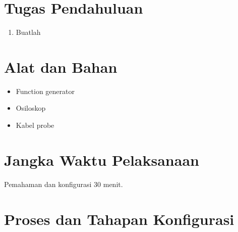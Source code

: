 \section{Tugas Pendahuluan}
\begin{enumerate}
\item Buatlah
\end{enumerate}

\section{Alat dan Bahan}
\begin{itemize}[label=$\bullet$, itemsep=-1pt, leftmargin=*]
	\item Function generator
	\item Osiloskop
	\item Kabel probe
\end{itemize}

\section{Jangka Waktu Pelaksanaan}
Pemahaman dan konfigurasi 30 menit.


\section{Proses dan Tahapan Konfigurasi}
